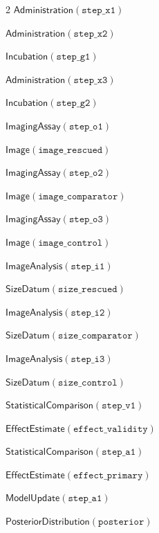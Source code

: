 \documentclass[10pt,a4paper]{article}
\begin{document}
{\begin{multicols}{2}
$\mathsf{Administration}(\mathtt{step\_\allowbreak{}\allowbreak{}x1})$\par
$\mathsf{Administration}(\mathtt{step\_\allowbreak{}\allowbreak{}x2})$\par
$\mathsf{Incubation}(\mathtt{step\_\allowbreak{}\allowbreak{}g1})$\par
$\mathsf{Administration}(\mathtt{step\_\allowbreak{}\allowbreak{}x3})$\par
$\mathsf{Incubation}(\mathtt{step\_\allowbreak{}\allowbreak{}g2})$\par
$\mathsf{ImagingAssay}(\mathtt{step\_\allowbreak{}\allowbreak{}o1})$\par
$\mathsf{Image}(\mathtt{image\_\allowbreak{}\allowbreak{}rescued})$\par
$\mathsf{ImagingAssay}(\mathtt{step\_\allowbreak{}\allowbreak{}o2})$\par
$\mathsf{Image}(\mathtt{image\_\allowbreak{}\allowbreak{}comparator})$\par
$\mathsf{ImagingAssay}(\mathtt{step\_\allowbreak{}\allowbreak{}o3})$\par
$\mathsf{Image}(\mathtt{image\_\allowbreak{}\allowbreak{}control})$\par
$\mathsf{ImageAnalysis}(\mathtt{step\_\allowbreak{}\allowbreak{}i1})$\par
$\mathsf{SizeDatum}(\mathtt{size\_\allowbreak{}\allowbreak{}rescued})$\par
$\mathsf{ImageAnalysis}(\mathtt{step\_\allowbreak{}\allowbreak{}i2})$\par
$\mathsf{SizeDatum}(\mathtt{size\_\allowbreak{}\allowbreak{}comparator})$\par
$\mathsf{ImageAnalysis}(\mathtt{step\_\allowbreak{}\allowbreak{}i3})$\par
$\mathsf{SizeDatum}(\mathtt{size\_\allowbreak{}\allowbreak{}control})$\par
$\mathsf{StatisticalComparison}(\mathtt{step\_\allowbreak{}\allowbreak{}v1})$\par
$\mathsf{EffectEstimate}(\mathtt{effect\_\allowbreak{}\allowbreak{}validity})$\par
$\mathsf{StatisticalComparison}(\mathtt{step\_\allowbreak{}\allowbreak{}a1})$\par
$\mathsf{EffectEstimate}(\mathtt{effect\_\allowbreak{}\allowbreak{}primary})$\par
$\mathsf{ModelUpdate}(\mathtt{step\_\allowbreak{}\allowbreak{}a1})$\par
$\mathsf{PosteriorDistribution}(\mathtt{posterior})$\par

\end{multicols}}
\end{document}
